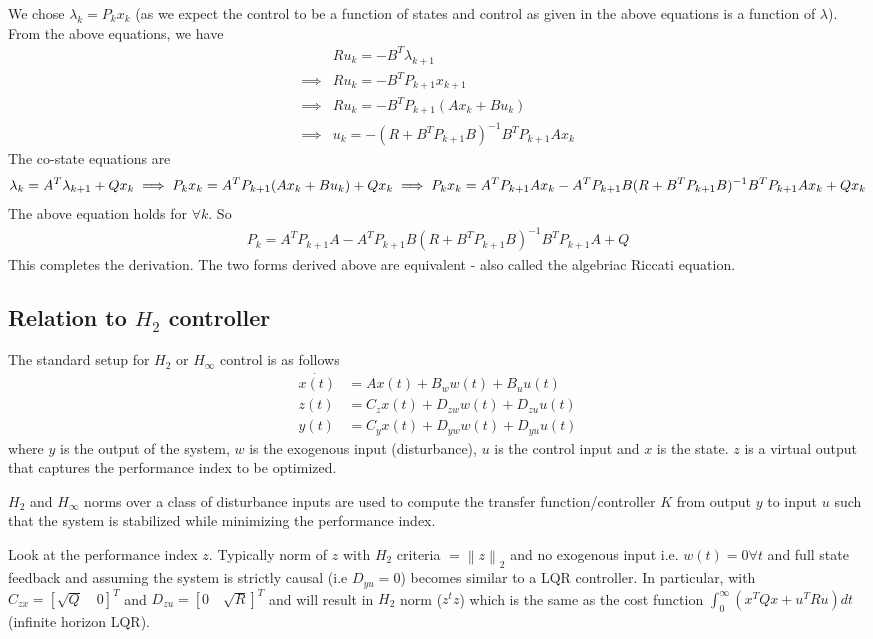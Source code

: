 We chose $\lambda_k = P_kx_k$ (as we expect the control to be a function of states and control as given in the above equations is a function of $\lambda$).
From the above equations, we have
\begin{align}
    & Ru_k = -B^T\lambda_{k+1} \\
    \implies & Ru_k = -B^TP_{k+1}x_{k+1} \\
    \implies & Ru_k = -B^TP_{k+1}(Ax_k + Bu_k) \\
    \implies & u_k = -(R+B^TP_{k+1}B)^{-1}B^TP_{k+1}Ax_k
\end{align}
The co-state equations are
\begin{dmath}
     \lambda_{k} = A^T\lambda_{k+1} + Qx_k
     \implies  P_kx_k = A^TP_{k+1}(Ax_k+Bu_k) + Qx_k \\
     \implies  P_kx_k = A^TP_{k+1}Ax_k - A^TP_{k+1}B(R+B^TP_{k+1}B)^{-1}B^TP_{k+1}Ax_k + Qx_k
\end{dmath}
The above equation holds for $\forall k$.
So
\begin{align}
     P_k = A^TP_{k+1}A - A^TP_{k+1}B(R+B^TP_{k+1}B)^{-1}B^TP_{k+1}A + Q
\end{align}
This completes the derivation. The two forms derived above are equivalent  - also called the algebriac Riccati equation.
\subsection{Relation to $H_2$ controller}
The standard setup for $H_2$ or $H_{\infty}$ control is as follows
\begin{align}
    \dot{x(t)} &= Ax(t) + B_ww(t)+B_uu(t) \\
    z(t) &= C_zx(t) + D_{zw}w(t)+D_{zu}u(t) \\
    y(t) &= C_yx(t) + D_{yw}w(t) + D_{yu}u(t)
\end{align}
where $y$ is the output of the system, $w$ is the exogenous input (disturbance), $u$ is the control input and $x$ is the state. $z$ is a virtual output that captures the performance index to be optimized.  

$H_2$ and $H_{\infty}$ norms over a class of disturbance inputs are used to compute the transfer function/controller $K$ from output $y$ to input $u$ such that the system is stabilized while minimizing the performance index.

Look at the performance index $z$. Typically norm of $z$ with $H_2$ criteria $=\left\lVert z \right\rVert_2$ and no exogenous input i.e. $w(t)=0 \forall t$ and full state feedback and assuming the system is strictly causal (i.e $D_{yu} = 0$) becomes similar to a LQR controller. In particular, with $C_{zx}=[\sqrt{Q}\quad0]^T$ and $D_{zu}=[0\quad\sqrt{R}]^T$ and will result in $H_2$ norm ($z^tz$) which is the same as the cost function $\int_{0}^{\infty}(x^TQx+u^TRu) dt$ (infinite horizon LQR). 

